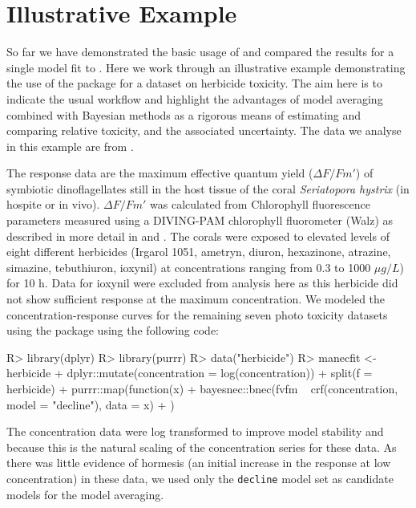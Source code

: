 \documentclass[
  shortnames]{jss}
\begin{document}
\section[Illustrative Example]{Illustrative Example}\label{iexample}

So far we have demonstrated the basic usage of  and compared the results for a single model fit to . Here we work through an illustrative example demonstrating the use of the package for a dataset on herbicide toxicity. The aim here is to indicate the usual workflow and highlight the advantages of model averaging combined with Bayesian methods as a rigorous means of estimating and comparing relative toxicity, and the associated uncertainty. The data we analyse in this example are from \citet{jones2003meps}.

The response data are the maximum effective quantum yield (\({\Delta F / Fm'}\)) of symbiotic dinoflagellates still in the host tissue of the coral \emph{Seriatopora hystrix} (in hospite or in vivo). \({\Delta F / Fm'}\) was calculated from Chlorophyll fluorescence parameters measured using a DIVING-PAM chlorophyll fluorometer (Walz) as described in more detail in \citet{jones2003meps} and \citet{jones2003effects}. The corals were exposed to elevated levels of eight different herbicides (Irgarol 1051, ametryn, diuron, hexazinone, atrazine, simazine, tebuthiuron, ioxynil) at concentrations ranging from 0.3 to 1000 \({\mu g/L}\)) for 10 h. Data for ioxynil were excluded from analysis here as this herbicide did not show sufficient response at the maximum concentration. We modeled the concentration-response curves for the remaining seven photo toxicity datasets using the  package using the following code:

\begin{CodeChunk}
\begin{CodeInput}
R> library(dplyr)
R> library(purrr)
R> data("herbicide")
R> manecfit <- herbicide %
+   dplyr::mutate(concentration = log(concentration)) %
+   split(f = ~ herbicide) %
+   purrr::map(function(x) {
+     bayesnec::bnec(fvfm ~ crf(concentration, model = "decline"), data = x)
+   })
\end{CodeInput}
\end{CodeChunk}

The concentration data were log transformed to improve model stability and because this is the natural scaling of the concentration series for these data. As there was little evidence of hormesis (an initial increase in the response at low concentration) in these data, we used only the \texttt{decline} model set as candidate models for the model averaging.
\end{document}
